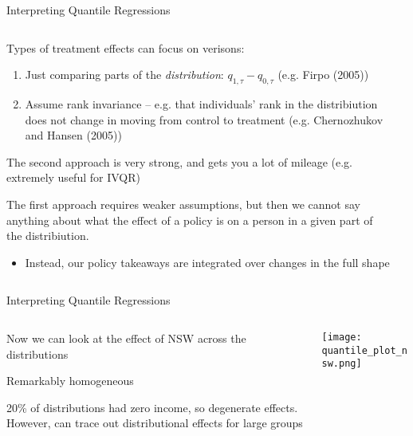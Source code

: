 \documentclass[notes,11pt, aspectratio=169]{beamer}
\newenvironment{wideitemize}{\itemize\addtolength{\itemsep}{10pt}}{\enditemize}
\begin{document}
\begin{frame}{Interpreting Quantile Regressions}
  \begin{columns}[T] %
    \begin{column}{.7\textwidth}
      \begin{wideitemize}
      \item Types of treatment effects can focus on verisons:
        \begin{enumerate}
        \item Just comparing parts of the \emph{distribution}: $q_{1,\tau} - q_{0,\tau}$ (e.g. Firpo (2005))
        \item Assume rank invariance -- e.g. that individuals' rank
          in the distribiution does not change in moving from
          control to treatment (e.g. Chernozhukov and Hansen (2005))
        \end{enumerate}
      \item The second approach is very strong, and gets you a lot
        of mileage (e.g. extremely useful for IVQR)
      \item The first approach requires weaker assumptions, but then
        we cannot say anything about what the effect of a policy is on
        a person in a given part of the distribiution.
        \begin{itemize}
        \item Instead, our policy takeaways are integrated over changes in the full shape
        \end{itemize}
      \end{wideitemize}
    \end{column}%
    \hfill%
    \begin{column}{.4\textwidth}
    \end{column}
  \end{columns}
\end{frame}

\begin{frame}{Interpreting Quantile Regressions}
  \begin{columns}[T] %
    \begin{column}{.5\textwidth}
      \begin{wideitemize}
      \item Now we can look at the effect of NSW across the distributions
      \item Remarkably homogeneous
      \item 20\% of distributions had zero income, so degenerate
        effects. However, can trace out distributional effects for
        large groups
      \end{wideitemize}
    \end{column}%
    \hfill%
    \begin{column}{.5\textwidth}
      \texttt{[image: quantile\_plot\_nsw.png]}
    \end{column}
  \end{columns}
\end{frame}
\end{document}
